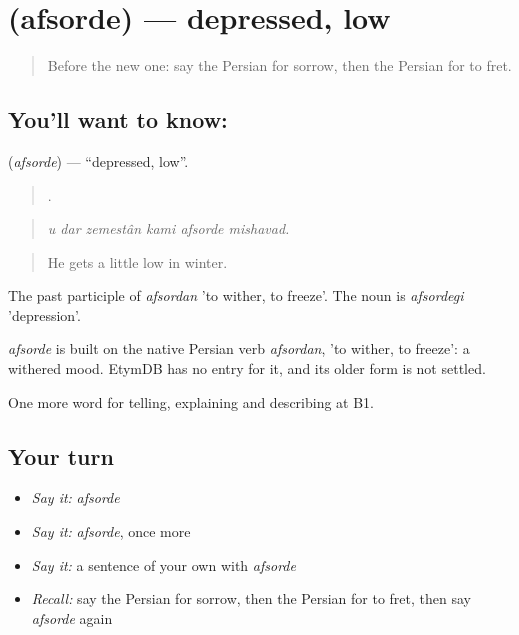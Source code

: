 \section[\texorpdfstring{\fa{افسرده} (afsorde)}{افسرده (afsorde)}]{ (afsorde) — depressed, low}

\label{lesson:FA-C484-afsorde}



\begin{quote}
Before the new one: say the Persian for sorrow, then the Persian for to fret.
\end{quote}

\subsection*{You'll want to know: }
\textbf{} (\emph{afsorde}) — \textquotedblleft{}depressed, low\textquotedblright{}.

\begin{quote}
     .
\end{quote}

\begin{quote}
\emph{u dar zemestân kami afsorde mishavad.}
\end{quote}

\begin{quote}
He gets a little low in winter.
\end{quote}

The past participle of \emph{afsordan} 'to wither, to freeze'. The noun is \emph{afsordegi} 'depression'.

\begin{cousinweb}
\emph{afsorde} is built on the native Persian verb \emph{afsordan}, 'to wither, to freeze': a withered mood. EtymDB has no entry for it, and its older form is not settled.
\end{cousinweb}

\begin{grammarlens}[title={What you've built}]
One more word for telling, explaining and describing at B1.
\end{grammarlens}

\subsection*{Your turn}
\begin{itemize}
\raggedright
  \item \emph{Say it:} \emph{afsorde}
  \item \emph{Say it:} \emph{afsorde}, once more
  \item \emph{Say it:} a sentence of your own with \emph{afsorde}
  \item \emph{Recall:} say the Persian for sorrow, then the Persian for to fret, then say \emph{afsorde} again
\end{itemize}

